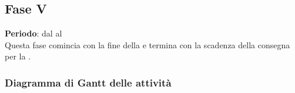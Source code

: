 \subsection{Fase V}
	\textbf{Periodo}: dal  al  \\Questa fase comincia con la fine della  e termina con la scadenza della consegna per la .
	\subsubsection{Diagramma di Gantt delle attività}
